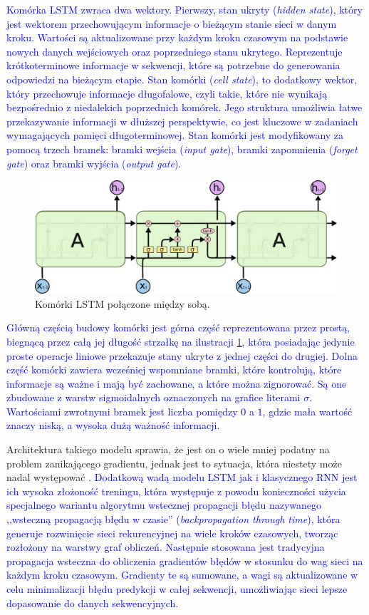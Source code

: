 \documentclass[data-science]{agh-wi} %
\begin{document}
\textcolor{blue}{Komórka LSTM zwraca dwa wektory. Pierwszy, stan ukryty (\textit{hidden state}), który jest wektorem przechowującym informacje o bieżącym stanie sieci w danym kroku. Wartości są aktualizowane przy każdym kroku czasowym na podstawie nowych danych wejściowych oraz poprzedniego stanu ukrytego. Reprezentuje krótkoterminowe informacje w sekwencji, które są potrzebne do generowania odpowiedzi na bieżącym etapie. Stan komórki (\textit{cell state}), to dodatkowy wektor, który przechowuje informacje długofalowe, czyli takie, które nie wynikają bezpośrednio z niedalekich poprzednich komórek. Jego struktura umożliwia łatwe przekazywanie informacji w dłuższej perspektywie, co jest kluczowe w zadaniach wymagających pamięci długoterminowej. Stan komórki jest modyfikowany za pomocą trzech bramek: bramki wejścia (\textit{input gate}), bramki zapomnienia (\textit{forget gate}) oraz bramki wyjścia (\textit{output gate}).}

\begin{figure}[ht!]
    \begin{center}
        \includegraphics[width=0.6\linewidth]{./img/LSTM3-chain.png}
    \end{center}
    \caption{Komórki LSTM połączone między sobą.}\label{fig:lstm_chain}
\end{figure}

\textcolor{blue}{Główną częścią budowy komórki jest górna część reprezentowana przez prostą, biegnącą przez całą jej długość strzałkę na ilustracji \ref*{fig:lstm_chain}, która posiadając jedynie proste operacje liniowe przekazuje stany ukryte z jednej części do drugiej. Dolna część komórki zawiera wcześniej wspomniane bramki, które kontrolują, które informacje są ważne i mają być zachowane, a które można zignorować. Są one zbudowane z warstw sigmoidalnych oznaczonych na grafice literami $\sigma$. Wartościami zwrotnymi \textcolor{blue}{bramek} jest liczba pomiędzy $0$ a $1$, gdzie mała wartość znaczy niską, a wysoka dużą ważność informacji.} 

Architektura takiego modelu sprawia, że jest on o wiele mniej podatny na problem zanikającego gradientu, jednak jest to sytuacja, która niestety może nadal występować \cite{vanishing_gradient}. \textcolor{blue}{Dodatkową wadą modelu LSTM jak i klasycznego RNN jest ich wysoka złożoność treningu, która występuje z powodu konieczności użycia specjalnego wariantu algorytmu wstecznej propagacji błędu nazywanego ,,wsteczną propagacją błędu w czasie'' (\textit{backpropagation through time}), która generuje rozwinięcie sieci rekurencyjnej na wiele kroków czasowych, tworząc rozłożony na warstwy graf obliczeń. Następnie stosowana jest tradycyjna propagacja wsteczna do obliczenia gradientów błędów w stosunku do wag sieci na każdym kroku czasowym. Gradienty te są sumowane, a wagi są aktualizowane w celu minimalizacji błędu predykcji w całej sekwencji, umożliwiając sieci lepsze dopasowanie do danych sekwencyjnych.}
\end{document}
